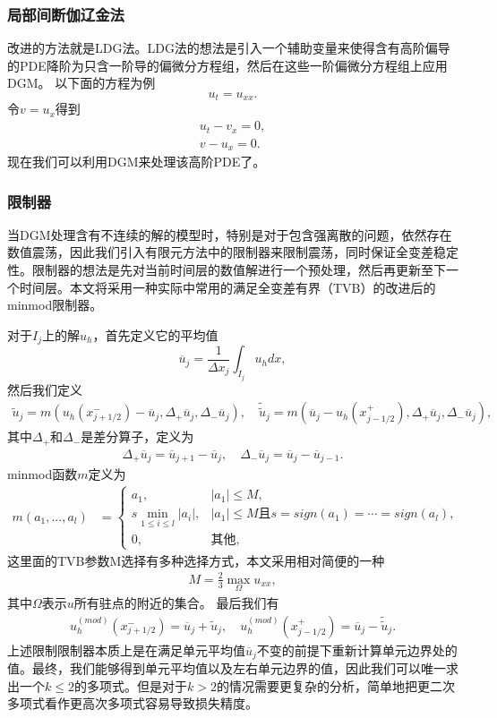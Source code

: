 \subsubsection{局部间断伽辽金法}
改进的方法就是LDG法。LDG法的想法是引入一个辅助变量来使得含有高阶偏导的PDE降阶为只含一阶导的偏微分方程组，然后在这些一阶偏微分方程组上应用DGM。
以下面的方程为例
\begin{equation}
	u_t = u_{xx}.
\end{equation}
令$v = u_x$得到
\begin{align}
	u_t - v_x = 0, \\
	v - u_x = 0.
\end{align}
现在我们可以利用DGM来处理该高阶PDE了。
\subsubsection{限制器}
当DGM处理含有不连续的解的模型时，特别是对于包含强离散的问题，依然存在数值震荡，因此我们引入有限元方法中的限制器来限制震荡，同时保证全变差稳定性。限制器的想法是先对当前时间层的数值解进行一个预处理，然后再更新至下一个时间层。本文将采用一种实际中常用的满足全变差有界（TVB）的改进后的minmod限制器\cite{cockburn1989tvb2}。

对于$I_j$上的解$u_h$，首先定义它的平均值
$$
	\overline{u}_j = \frac{1}{\Delta x_j}\int_{I_j}u_h dx,
$$
然后我们定义
\begin{align}
	\tilde{u}_j = m(u_h(x^-_{j+1/2})-\overline{u}_j, \Delta_+\overline{u}_j, \Delta_-\overline{u}_j), \quad \tilde{\tilde{u}}_j = m(\overline{u}_j-u_h(x^+_{j-1/2}), \Delta_+\overline{u}_j, \Delta_-\overline{u}_j),
\end{align}
其中$\Delta_+$和$\Delta_-$是差分算子，定义为
\begin{align}
	\Delta_+\overline{u}_j = \overline{u}_{j+1}-\overline{u}_{j}, \quad \Delta_-\overline{u}_j = \overline{u}_{j}-\overline{u}_{j-1}.
\end{align}
minmod函数$m$定义为
\begin{align}
	m(a_1, ..., a_l) & =
	\begin{cases}
		a_1,                         & |a_1| \leq M,                                             \\
		s \min_{1\leq i\leq l}|a_i|, & |a_1| \leq M \text{且}s = sign(a_1) = \cdots = sign(a_l), \\
		0 ,                          & \text{其他},
	\end{cases}
\end{align}
这里面的TVB参数M选择有多种选择方式，本文采用相对简便的一种\cite{cockburn1989tvb3}
\begin{align}
	M = \frac{2}{3}\max_{\Omega}u_{xx},
\end{align}
其中$\Omega$表示$u$所有驻点的附近的集合。
最后我们有
\begin{align}
	u^{(mod)}_h(x^-_{j+1/2}) = \overline{u}_j + \tilde{u}_j, \quad u^{(mod)}_h(x^+_{j-1/2}) = \overline{u}_j - \tilde{\tilde{u}}_j.
\end{align}
上述限制限制器本质上是在满足单元平均值$\overline{u}_j$不变的前提下重新计算单元边界处的值。最终，我们能够得到单元平均值以及左右单元边界的值，因此我们可以唯一求出一个$k\leq 2$的多项式。但是对于$k> 2$的情况需要更复杂的分析，简单地把更二次多项式看作更高次多项式容易导致损失精度。
